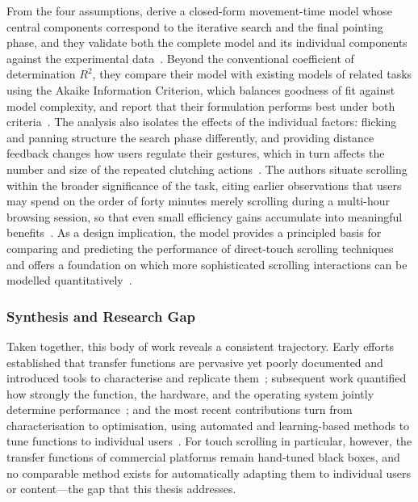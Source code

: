 From the four assumptions, \citeauthor{zhao2014model} derive a closed-form movement-time model whose central components correspond to the iterative search and the final pointing phase, and they validate both the complete model and its individual components against the experimental data~\cite{zhao2014model}. Beyond the conventional coefficient of determination $R^2$, they compare their model with existing models of related tasks using the Akaike Information Criterion, which balances goodness of fit against model complexity, and report that their formulation performs best under both criteria~\cite{zhao2014model}. The analysis also isolates the effects of the individual factors: flicking and panning structure the search phase differently, and providing distance feedback changes how users regulate their gestures, which in turn affects the number and size of the repeated clutching actions~\cite{zhao2014model}. The authors situate scrolling within the broader significance of the task, citing earlier observations that users may spend on the order of forty minutes merely scrolling during a multi-hour browsing session, so that even small efficiency gains accumulate into meaningful benefits~\cite{zhao2014model}. As a design implication, the model provides a principled basis for comparing and predicting the performance of direct-touch scrolling techniques and offers a foundation on which more sophisticated scrolling interactions can be modelled quantitatively~\cite{zhao2014model}.

\subsubsection{Synthesis and Research Gap}

Taken together, this body of work reveals a consistent trajectory. Early efforts established that transfer functions are pervasive yet poorly documented and introduced tools to characterise and replicate them~\cite{casiez2011no, quinn2012exposing, quinn2013touch}; subsequent work quantified how strongly the function, the hardware, and the operating system jointly determine performance~\cite{hanada2021relevance, an2025libpad, kim2025hardware}; and the most recent contributions turn from characterisation to optimisation, using automated and learning-based methods to tune functions to individual users~\cite{lee2020autogain, eddy2026tftune}. For touch scrolling in particular, however, the transfer functions of commercial platforms remain hand-tuned black boxes, and no comparable method exists for automatically adapting them to individual users or content---the gap that this thesis addresses.
